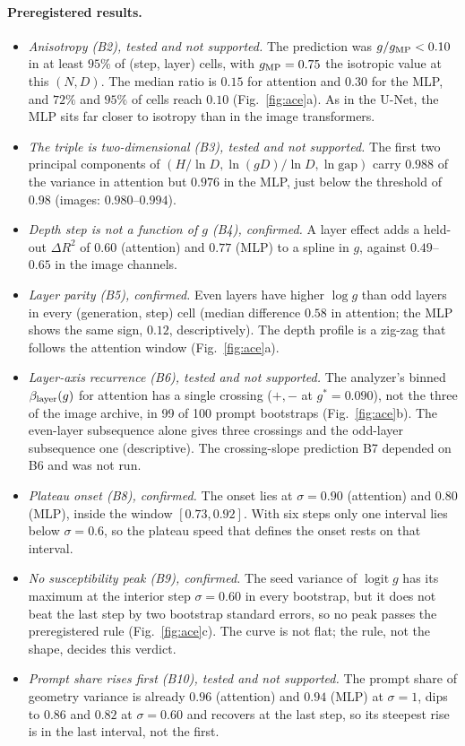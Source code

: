 \documentclass[11pt]{article}
\newcommand{\gap}{\mathrm{gap}}
\begin{document}
\paragraph{Preregistered results.}
\begin{itemize}
 \item \emph{Anisotropy (B2), tested and not supported.} The prediction was $g/g_{\rm MP}<0.10$ in at least $95\%$ of (step, layer) cells, with $g_{\rm MP}=0.75$ the isotropic value at this $(N,D)$. The median ratio is $0.15$ for attention and $0.30$ for the MLP, and $72\%$ and $95\%$ of cells reach $0.10$ (Fig.~\ref{fig:ace}a). As in the U-Net, the MLP sits far closer to isotropy than in the image transformers.
 \item \emph{The triple is two-dimensional (B3), tested and not supported.} The first two principal components of $(H/\ln D, \ln(gD)/\ln D, \ln\gap)$ carry $0.988$ of the variance in attention but $0.976$ in the MLP, just below the threshold of $0.98$ (images: $0.980$--$0.994$).
 \item \emph{Depth step is not a function of $g$ (B4), confirmed.} A layer effect adds a held-out $\Delta R^2$ of $0.60$ (attention) and $0.77$ (MLP) to a spline in $g$, against $0.49$--$0.65$ in the image channels.
 \item \emph{Layer parity (B5), confirmed.} Even layers have higher $\log g$ than odd layers in every (generation, step) cell (median difference $0.58$ in attention; the MLP shows the same sign, $0.12$, descriptively). The depth profile is a zig-zag that follows the attention window (Fig.~\ref{fig:ace}a).
 \item \emph{Layer-axis recurrence (B6), tested and not supported.} The analyzer's binned $\beta_{\rm layer}(g)$ for attention has a single crossing ($+,-$ at $g^{*}=0.090$), not the three of the image archive, in 99 of 100 prompt bootstraps (Fig.~\ref{fig:ace}b). The even-layer subsequence alone gives three crossings and the odd-layer subsequence one (descriptive). The crossing-slope prediction B7 depended on B6 and was not run.
 \item \emph{Plateau onset (B8), confirmed.} The onset lies at $\sigma=0.90$ (attention) and $0.80$ (MLP), inside the window $[0.73,0.92]$. With six steps only one interval lies below $\sigma=0.6$, so the plateau speed that defines the onset rests on that interval.
 \item \emph{No susceptibility peak (B9), confirmed.} The seed variance of $\operatorname{logit} g$ has its maximum at the interior step $\sigma=0.60$ in every bootstrap, but it does not beat the last step by two bootstrap standard errors, so no peak passes the preregistered rule (Fig.~\ref{fig:ace}c). The curve is not flat; the rule, not the shape, decides this verdict.
 \item \emph{Prompt share rises first (B10), tested and not supported.} The prompt share of geometry variance is already $0.96$ (attention) and $0.94$ (MLP) at $\sigma=1$, dips to $0.86$ and $0.82$ at $\sigma=0.60$ and recovers at the last step, so its steepest rise is in the last interval, not the first.
\end{itemize}
\end{document}

